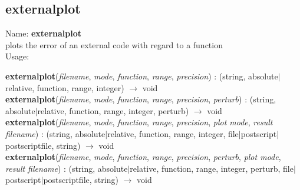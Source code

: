 \subsection{externalplot}
\label{labexternalplot}
\noindent Name: \textbf{externalplot}\\
plots the error of an external code with regard to a function\\

\noindent Usage: 
\begin{center}
\textbf{externalplot}(\emph{filename}, \emph{mode}, \emph{function}, \emph{range}, \emph{precision}) : (\textsf{string}, \textsf{absolute$|$relative}, \textsf{function}, \textsf{range}, \textsf{integer}) $\rightarrow$ \textsf{void}\\
\textbf{externalplot}(\emph{filename}, \emph{mode}, \emph{function}, \emph{range}, \emph{precision}, \emph{perturb}) : (\textsf{string}, \textsf{absolute$|$relative}, \textsf{function}, \textsf{range}, \textsf{integer}, \textsf{perturb}) $\rightarrow$ \textsf{void}\\
\textbf{externalplot}(\emph{filename}, \emph{mode}, \emph{function}, \emph{range}, \emph{precision}, \emph{plot mode}, \emph{result filename}) : (\textsf{string}, \textsf{absolute$|$relative}, \textsf{function}, \textsf{range}, \textsf{integer}, \textsf{file$|$postscript$|$postscriptfile}, \textsf{string}) $\rightarrow$ \textsf{void}\\
\textbf{externalplot}(\emph{filename}, \emph{mode}, \emph{function}, \emph{range}, \emph{precision}, \emph{perturb}, \emph{plot mode}, \emph{result filename}) : (\textsf{string}, \textsf{absolute$|$relative}, \textsf{function}, \textsf{range}, \textsf{integer}, \textsf{perturb}, \textsf{file$|$postscript$|$postscriptfile}, \textsf{string}) $\rightarrow$ \textsf{void}\\
\end{center}
